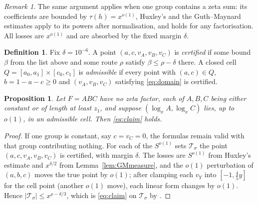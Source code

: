 \documentclass[11pt]{amsart}
\newtheorem{proposition}[theorem]{Proposition}
\theoremstyle{definition}
\newtheorem{definition}[theorem]{Definition}
\theoremstyle{remark}
\newtheorem{remark}[theorem]{Remark}
\begin{document}
\begin{remark}\label{rem:zetamain}
The same argument applies when one group contains a zeta sum: its coefficients are bounded by $\tau(h)=x^{o(1)}$, Huxley's and the Guth--Maynard estimates apply to its powers after normalisation, and \cite[Lemma~5.8]{J} holds for any factorisation. All losses are $x^{o(1)}$ and are absorbed by the fixed margin $\delta$.
\end{remark}

\begin{definition}\label{def:cert}
Fix $\delta=10^{-6}$. A point $(a,c,v_A,v_B,v_C)$ is \emph{certified} if some bound $\beta$ from the list above and some route $\rho$ satisfy $\beta\le\rho-\delta$ there. A closed cell $Q=[a_0,a_1]\times[c_0,c_1]$ is \emph{admissible} if every point with $(a,c)\in Q$, $b=1-a-c\ge0$ and $(v_A,v_B,v_C)$ satisfying \eqref{eq:domain} is certified.
\end{definition}

\begin{proposition}\label{prop:ranges}
Let $F=ABC$ have no zeta factor, each of $A,B,C$ being either constant or of length at least $z_1$, and suppose $(\log_xA,\log_xC)$ lies, up to $o(1)$, in an admissible cell. Then \eqref{eq:claim} holds.
\end{proposition}

\begin{proof}
If one group is constant, say $c=v_C=0$, the formulas remain valid with that group contributing nothing. For each of the $S^{o(1)}$ sets $\mathcal T_\sigma$ the point $(a,c,v_A,v_B,v_C)$ is certified, with margin $\delta$. The losses are $S^{o(1)}$ from Huxley's estimate and $x^{\delta/2}$ from Lemma~\ref{lem:GMmeasure}, and the $o(1)$ perturbation of $(a,b,c)$ moves the true point by $o(1)$; after clamping each $v_Y$ into $[-1,\frac45 y]$ for the cell point (another $o(1)$ move), each linear form changes by $o(1)$. Hence $|\mathcal T_\sigma|\le x^{\rho-\delta/3}$, which is \eqref{eq:claim} on $\mathcal T_\sigma$ by \cite[(5.7)--(5.8)]{J}.
\end{proof}
\end{document}
